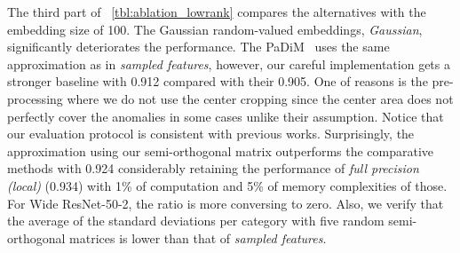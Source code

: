  The third part of \tbl~\ref{tbl:ablation_lowrank} compares the alternatives with the embedding size  of 100. The Gaussian random-valued embeddings, \textit{Gaussian}, significantly deteriorates the performance. The PaDiM~\cite{Defard2020} uses the same approximation as in \textit{sampled features}, however, our careful implementation gets a stronger baseline with 0.912 compared with their 0.905. One of reasons is the pre-processing where we do not use the center cropping since the center area does not perfectly cover the anomalies in some cases unlike their assumption. Notice that our evaluation protocol is consistent with previous works. Surprisingly, the approximation using our semi-orthogonal matrix outperforms the comparative methods with 0.924 considerably retaining the performance of \textit{full precision (local)} (0.934) with 1\% of computation and 5\% of memory complexities of those. For Wide ResNet-50-2, the ratio is more conversing to zero.
Also, we verify that the average of the standard deviations per category with five random semi-orthogonal matrices is lower than that of \textit{sampled features}.

